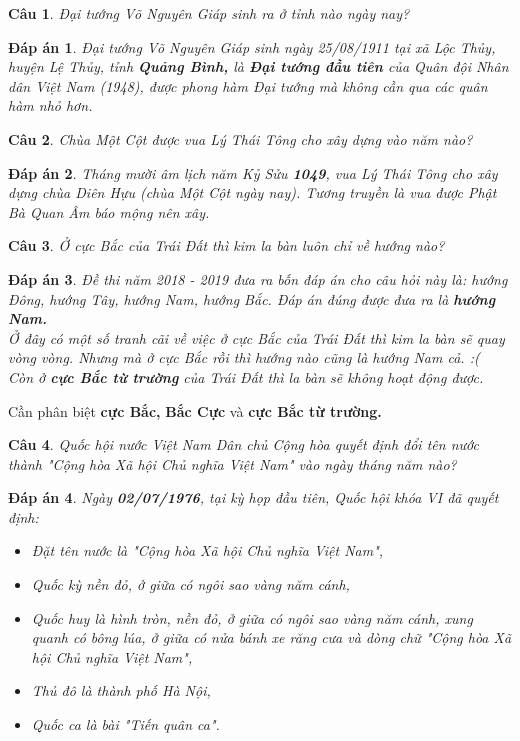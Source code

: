 \documentclass[12pt,a4paper]{article}
\newtheorem{ques}{Câu}
\theoremstyle{nonumberplain}
\newtheorem{ans}{Đáp án}
\begin{document}
\begin{ques}
Đại tướng Võ Nguyên Giáp sinh ra ở tỉnh nào ngày nay?
\end{ques}
\begin{mybox}
\begin{ans}
Đại tướng Võ Nguyên Giáp sinh ngày 25/08/1911 tại xã Lộc Thủy, huyện Lệ Thủy, tỉnh \textbf{Quảng Bình,} là \textbf{Đại tướng đầu tiên} của Quân đội Nhân dân Việt Nam (1948), được phong hàm Đại tướng mà không cần qua các quân hàm nhỏ hơn.
\end{ans} \end{mybox}
\begin{ques}
Chùa Một Cột được vua Lý Thái Tông cho xây dựng vào năm nào?
\end{ques}
\begin{mybox}
\begin{ans}
Tháng mười âm lịch năm Kỷ Sửu \textbf{1049}, vua Lý Thái Tông cho xây dựng chùa Diên Hựu (chùa Một Cột ngày nay). Tương truyền là vua được Phật Bà Quan Âm báo mộng nên xây.
\end{ans} \end{mybox}
\begin{ques}
Ở cực Bắc của Trái Đất thì kim la bàn luôn chỉ về hướng nào?
\end{ques}
\begin{mybox}
\begin{ans}
Đề thi năm 2018 - 2019 đưa ra bốn đáp án cho câu hỏi này là: hướng Đông, hướng Tây, hướng Nam, hướng Bắc. Đáp án đúng được đưa ra là \textbf{hướng Nam.}\\
Ở đây có một số tranh cãi về việc ở cực Bắc của Trái Đất thì kim la bàn sẽ quay vòng vòng. Nhưng mà ở cực Bắc rồi thì hướng nào cũng là hướng Nam cả. :(\\
Còn ở \textbf{cực Bắc từ trường} của Trái Đất thì la bàn sẽ không hoạt động được. \\
\end{ans} \end{mybox}
Cần phân biệt \textbf{cực Bắc,} \textbf{Bắc Cực} và \textbf{cực Bắc từ trường.}
\begin{ques}
Quốc hội nước Việt Nam Dân chủ Cộng hòa quyết định đổi tên nước thành \textit{"Cộng hòa Xã hội Chủ nghĩa Việt Nam"} vào ngày tháng năm nào?
\end{ques}
\begin{mybox}
\begin{ans}
Ngày \textbf{02/07/1976}, tại kỳ họp đầu tiên, Quốc hội khóa VI đã quyết định:
\begin{itemize}
\item Đặt tên nước là \textit{"Cộng hòa Xã hội Chủ nghĩa Việt Nam"},
\item Quốc kỳ nền đỏ, ở giữa có ngôi sao vàng năm cánh,
\item Quốc huy là hình tròn, nền đỏ, ở giữa có ngôi sao vàng năm cánh, xung quanh có bông lúa, ở giữa có nửa bánh xe răng cưa và dòng chữ "Cộng hòa Xã hội Chủ nghĩa Việt Nam",
\item Thủ đô là thành phố Hà Nội,
\item Quốc ca là bài \textit{"Tiến quân ca"}.
\end{itemize}
\end{ans} \end{mybox}
\end{document}
